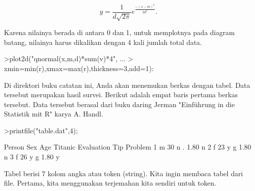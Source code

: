 \documentclass[a4paper,10pt]{article}
\begin{document}
\begin{eulernotebook}
\begin{eulercomment}
\begin{eulercomment}
\begin{eulercomment}
\begin{eulercomment}
\begin{eulercomment}
\begin{eulercomment}
\begin{eulercomment}
\begin{eulercomment}
\begin{eulercomment}
\begin{eulercomment}
\begin{eulercomment}
\begin{eulercomment}
\begin{eulercomment}
\begin{eulercomment}
\begin{eulercomment}
\begin{eulercomment}
\begin{eulercomment}
\begin{eulercomment}
\begin{eulercomment}
\begin{eulercomment}
\begin{eulercomment}
\begin{eulercomment}
\begin{eulercomment}
\begin{eulercomment}
\begin{eulercomment}
\begin{eulercomment}
\begin{eulercomment}
\begin{eulercomment}
\begin{eulercomment}
\begin{eulercomment}
\begin{eulercomment}
\begin{eulercomment}
\begin{eulercomment}
\end{eulercomment}
\begin{eulerformula}
\[
y=\frac{1}{d\sqrt{2\pi}}e^{\frac{-(x-m)^2}{2d^2}}.
\]
\end{eulerformula}
\begin{eulercomment}
Karena nilainya berada di antara 0 dan 1, untuk memplotnya pada
diagram batang, nilainya harus dikalikan dengan 4 kali jumlah total
data.
\end{eulercomment}
\begin{eulerprompt}
>plot2d("qnormal(x,m,d)*sum(v)*4", ...
>  xmin=min(r),xmax=max(r),thickness=3,add=1):
\end{eulerprompt}
\begin{eulercomment}
Di direktori buku catatan ini, Anda akan menemukan berkas dengan
tabel. Data tersebut merupakan hasil survei. Berikut adalah empat
baris pertama berkas tersebut. Data tersebut berasal dari buku daring
Jerman "Einführung in die Statistik mit R" karya A. Handl.
\end{eulercomment}
\begin{eulerprompt}
>printfile("table.dat",4);
\end{eulerprompt}
\begin{euleroutput}
  Person Sex Age Titanic Evaluation Tip Problem
  1 m 30 n . 1.80 n
  2 f 23 y g 1.80 n
  3 f 26 y g 1.80 y
\end{euleroutput}
\begin{eulercomment}
Tabel berisi 7 kolom angka atau token (string). Kita ingin membaca
tabel dari file. Pertama, kita menggunakan terjemahan kita sendiri
untuk token.


\end{eulercomment}
\end{eulercomment}
\end{eulercomment}
\end{eulercomment}
\end{eulercomment}
\end{eulercomment}
\end{eulercomment}
\end{eulercomment}
\end{eulercomment}
\end{eulercomment}
\end{eulercomment}
\end{eulercomment}
\end{eulercomment}
\end{eulercomment}
\end{eulercomment}
\end{eulercomment}
\end{eulercomment}
\end{eulercomment}
\end{eulercomment}
\end{eulercomment}
\end{eulercomment}
\end{eulercomment}
\end{eulercomment}
\end{eulercomment}
\end{eulercomment}
\end{eulercomment}
\end{eulercomment}
\end{eulercomment}
\end{eulercomment}
\end{eulercomment}
\end{eulercomment}
\end{eulercomment}
\end{eulercomment}
\end{eulernotebook}
\end{document}
